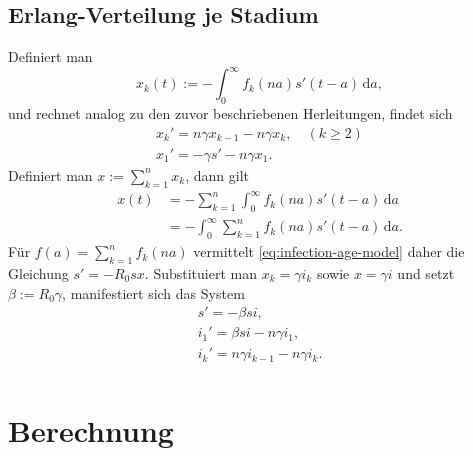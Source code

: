 \documentclass[a4paper,10pt,fleqn,twocolumn,twoside,dvipdfmx]{scrartcl}
\numberwithin{equation}{section}
\begin{document}
\subsection{Erlang-Verteilung je Stadium}

Definiert man
\[x_k(t) := -\int_0^\infty f_k(na)s'(t-a)\,\mathrm da,\]
und rechnet analog zu den zuvor beschriebenen Herleitungen,
findet sich
\begin{gather*}
x_k' = n\gamma x_{k-1}-n\gamma x_k,\quad (k\ge 2)\\
x_1' = -\gamma s' - n\gamma x_1.
\end{gather*}
Definiert man $x:=\sum_{k=1}^n x_k$, dann gilt
\begin{align*}
x(t) &= -\sum_{k=1}^n \int_0^\infty f_k(na)s'(t-a)\,\mathrm da\\
&= -\int_0^\infty \sum_{k=1}^n f_k(na)s'(t-a)\,\mathrm da.
\end{align*}
Für $f(a) = \sum_{k=1}^n f_k(na)$ vermittelt
\eqref{eq:infection-age-model} daher die Gleichung $s' = -R_0 sx$.
Substituiert man $x_k = \gamma i_k$ sowie $x=\gamma i$ und
setzt $\beta := R_0\gamma$, manifestiert sich das System
\begin{gather*}
s' = -\beta si,\\
i_1' = \beta si - n\gamma i_1,\\
i_k' = n\gamma i_{k-1}-n\gamma i_k.\\
\end{gather*}


\newpage
\section{Berechnung}
\end{document}
